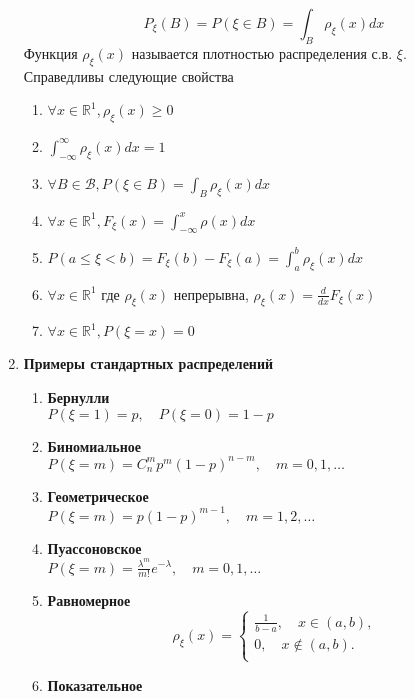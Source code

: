 \documentclass[A4]{article}
\begin{document}
\begin{enumerate}
	\begin{equation}
	P_{\xi}(B)=P(\xi\in B)=\int_{B}\rho_{\xi}(x)dx
	\end{equation} 
	Функция $\rho_{\xi}(x)$ называется плотностью распределения с.в. $\xi$.\\
	Справедливы следующие свойства
	\begin{enumerate}
		\item $\forall x\in \mathbb{R}^1,\rho_{\xi}(x)\ge0$
		\item $\int_{-\infty}^{\infty} \rho_{\xi}(x)dx=1$
		\item $\forall B\in \mathcal{B},P(\xi\in B)=\int_{B}\rho_{\xi}(x)dx$
		\item $\forall x\in \mathbb{R}^1,F_{\xi}(x)=\int_{-\infty}^{x}\rho(x)dx$
		\item $P(a\le\xi<b)=F_{\xi}(b)-F_{\xi}(a)=\int_{a}^{b}\rho_{\xi}(x)dx$
		\item $\forall x\in \mathbb{R}^1$ где $\rho_{\xi}(x)$ непрерывна, $\rho_{\xi}(x)=\frac{d}{dx}F_{\xi}(x)$
		\item $\forall x\in \mathbb{R}^1,P(\xi=x)=0$
	\end{enumerate}
	\item \textbf{Примеры стандартных распределений}
	\begin{enumerate}
		\item \textbf{Бернулли}\\
		$P(\xi=1)=p,\quad P(\xi=0)=1-p$
		\item \textbf{Биномиальное}\\
		$P(\xi=m)=C_n^mp^m(1-p)^{n-m},\quad m=0,1,\ldots$
		\item \textbf{Геометрическое}\\
		$P(\xi=m)=p(1-p)^{m-1},\quad m=1,2,\ldots$
		\item \textbf{Пуассоновское}\\
		$P(\xi=m)=\frac{\lambda^m}{m!} e^{-\lambda},\quad m=0,1,\ldots$
		\item \textbf{Равномерное}\\
		\begin{equation}
		\rho_{\xi}(x)=\left\{\begin{array}{l}
		\frac{1}{b-a},\quad x\in(a,b),\\
		0,\quad x\notin(a,b).\\
		\end{array}\right.
		\end{equation}
		\item \textbf{Показательное}\\

\end{enumerate}
\end{enumerate}
\end{document}

